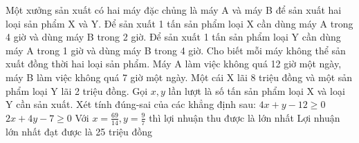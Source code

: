 \begin{ex}
 Một xưởng sản xuất có hai máy đặc chủng là máy A và máy B để sản xuất hai loại sản phẩm X và Y. Để sản xuất 1 tấn sản phẩm loại X cần dùng máy A trong 4 giờ và dùng máy B trong 2 giờ. Để sản xuất 1 tấn sản phẩm loại Y cần dùng máy A trong 1 giờ và dùng máy B trong 4 giờ. Cho biết mỗi máy không thể sản xuất đồng thời hai loại sản phẩm. Máy A làm việc không quá 12 giờ một ngày, máy B làm việc không quá 7 giờ một ngày. Một cái X lãi 8 triệu đồng và một sản phẩm loại Y lãi 2 triệu đồng. Gọi ${x,y}$ lần lượt là số tấn sản phẩm loại X và loại Y cần sản xuất. Xét tính đúng-sai của các khẳng định sau:
\choiceTFt
{ $4 x + y - 12 \ge 0$ }
   { $2 x + 4 y - 7 \ge 0$ }
     { Với $x = \frac{69}{14}, y = \frac{9}{7}$ thì lợi nhuận thu được là lớn nhất }
    { Lợi nhuận lớn nhất đạt được là 25 triệu đồng  }
\end{ex}

